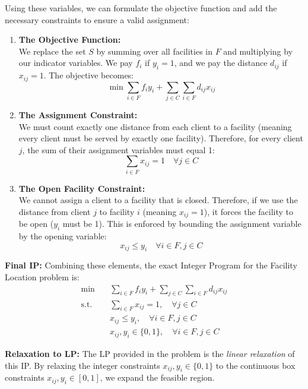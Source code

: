 Using these variables, we can formulate the objective function and add the necessary constraints to ensure a valid assignment:

\begin{enumerate}
    \item \textbf{The Objective Function:}\\
    We replace the set $S$ by summing over all facilities in $F$ and multiplying by our indicator variables. We pay $f_i$ if $y_i = 1$, and we pay the distance $d_{ij}$ if $x_{ij} = 1$. The objective becomes:
    \[ \min \sum_{i \in F} f_i y_i + \sum_{j \in C} \sum_{i \in F} d_{ij} x_{ij} \]

    \item \textbf{The Assignment Constraint:}\\
    We must count exactly one distance from each client to a facility (meaning every client must be served by exactly one facility). Therefore, for every client $j$, the sum of their assignment variables must equal 1:
    \[ \sum_{i \in F} x_{ij} = 1 \quad \forall j \in C \]

    \item \textbf{The Open Facility Constraint:}\\
    We cannot assign a client to a facility that is closed. Therefore, if we use the distance from client $j$ to facility $i$ (meaning $x_{ij} = 1$), it forces the facility to be open ($y_i$ must be 1). This is enforced by bounding the assignment variable by the opening variable:
    \[ x_{ij} \le y_i \quad \forall i \in F, j \in C \]
\end{enumerate}

\textbf{Final IP:}
Combining these elements, the exact Integer Program for the Facility Location problem is:
\begin{align*}
\min \quad & \sum_{i \in F} f_i y_i + \sum_{j \in C} \sum_{i \in F} d_{ij} x_{ij} \\
\text{s.t.} \quad & \sum_{i \in F} x_{ij} = 1, \quad \forall j \in C \\
& x_{ij} \le y_i, \quad \forall i \in F, j \in C \\
& x_{ij}, y_i \in \{0, 1\}, \quad \forall i \in F, j \in C
\end{align*}


\textbf{Relaxation to LP:}
The LP provided in the problem is the \textit{linear relaxation} of this IP. By relaxing the integer constraints $x_{ij}, y_i \in \{0, 1\}$ to the continuous box constraints $x_{ij}, y_i \in [0, 1]$, we expand the feasible region. 

